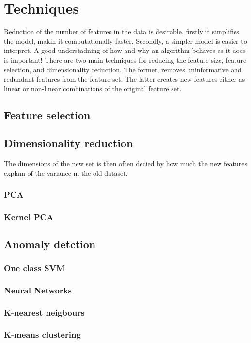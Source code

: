 \chapter{Techniques}\label{chap:techniques}

Reduction of the number of features in the data is desirable, firstly it simplifies the model, makin it computationally faster. Secondly, a simpler model is easier to interpret. A good understadning of how and why an algorithm behaves as it does is important! There are two main techniques for reducing the feature size, feature selection, and dimensionality reduction. The former, removes uninformative and redundant features from the feature set. The latter creates new features either as linear or non-linear combinations of the original feature set.

\section{Feature selection}\label{sec:feature_selec}

    \subsection{}

\section{Dimensionality reduction}\label{sec:dim_red}
The dimensions of the new set is then often decied by how much the new features explain of the variance in the old dataset. 
    \subsection{PCA}\label{subsec:PCA}
    
    \subsection{Kernel PCA}\label{subsec:kernelPCA}


\section{Anomaly detction}\label{sec:Anomaly_detection}
    
    \subsection{One class SVM}\label{subsec:OCSVM}
    
    \subsection{Neural Networks}\label{subsec:NN}
    
    \subsection{K-nearest neigbours}\label{subsec:k_neig}
    
    \subsection{K-means clustering}\label{subsec:k_means}
    